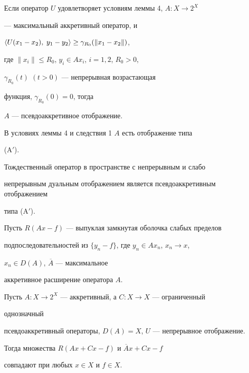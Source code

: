  


\begin{cor} Если оператор $U$ удовлетворяет условиям леммы 4, $A:X\to 2^X$ 


--- максимальный аккретивный оператор, и 


$\langle U(x_1-x_2),\;y_1-y_2\rangle\ge\gamma_{R_0}(\|x_1-x_2\|)$, 


где $\|x_i\|\le R_0$, $y_i\in Ax_i$, $i=1,2$, $R_0>0$, 


$\gamma_{R_0}(t)$ $(t>0)$ --- непрерывная возрастающая 


функция, $\gamma_{R_0}(0)=0$, тогда 


$A$ --- псевдоаккретивное отображение. 


\end{cor} 


 


\begin{cor} В условиях леммы 4 и следствия 1 $A$ есть отображение типа 


(A$'$). 


\end{cor} 


 


\begin{cor} Тождественный оператор в пространстве с непрерывным и слабо 


непрерывным дуальным отображением является псевдоаккретивным отображением 


типа (A$'$). 


\end{cor} 


 


Пусть $R(Ax-f)$ --- выпуклая замкнутая оболочка слабых пределов 


подпоследовательностей из $\{y_n-f\}$, где $y_n\in Ax_n$, $x_n\to x$, 


$x_n\in D(A)$, $\overline A$ --- максимальное 


аккретивное расширение оператора $A$. 


 


\begin{lem} Пусть $A:X\to 2^X$ --- аккретивный, а $C:X\to X$ --- ограниченный 


однозначный 


псевдоаккретивный операторы, $D(A)=X$, $U$ --- непрерывное отображение. 


Тогда множества $R(Ax+Cx-f)$ и $\overline Ax+Cx-f$


совпадают при любых $x\in X$ и $f\in X$. 


\end{lem} 


